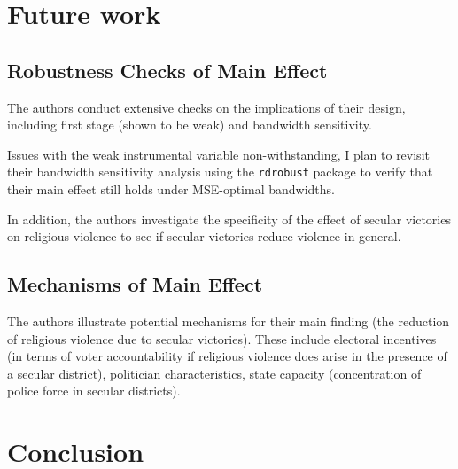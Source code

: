 \documentclass{scrartcl}
\begin{document}
\section{Future work}

\subsection{Robustness Checks of Main Effect}

The authors conduct extensive checks on the implications of their design, including first stage (shown to be weak) and bandwidth sensitivity. 

Issues with the weak instrumental variable non-withstanding, I plan to revisit their bandwidth sensitivity analysis using the \texttt{rdrobust} package to verify that their main effect still holds under MSE-optimal bandwidths.

In addition, the authors investigate the specificity of the effect of secular victories on religious violence to see if secular victories reduce violence in general. 

\subsection{Mechanisms of Main Effect}

The authors illustrate potential mechanisms for their main finding (the reduction of religious violence due to secular victories). These include electoral incentives (in terms of voter accountability if religious violence does arise in the presence of a secular district), politician characteristics, state capacity (concentration of police force in secular districts).

\section{Conclusion}



\end{document}
